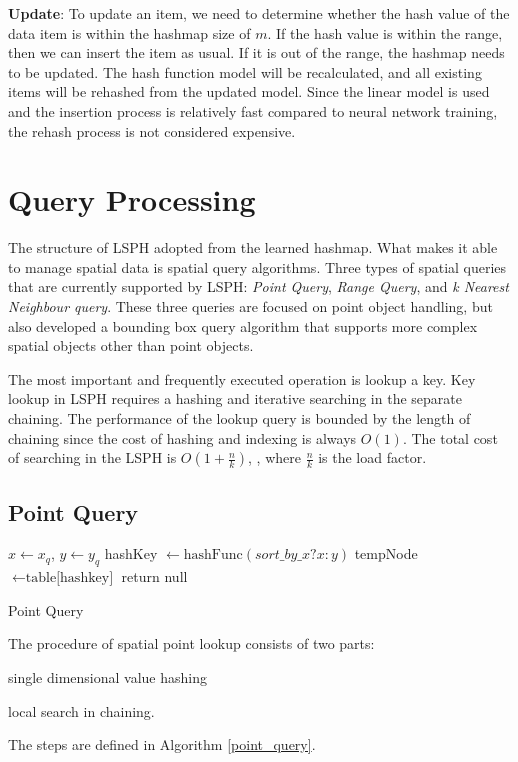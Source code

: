 \textbf{Update}: To update an item, we need to determine whether the hash value of the data item is within the hashmap size of $m$. If the hash value is within the range, then we can insert the item as usual. If it is out of the range, the hashmap needs to be updated. The hash function model will be recalculated, and all existing items will be rehashed from the updated model. Since the linear model is used and the insertion process is relatively fast compared to neural network training, the rehash process is not considered expensive. 

\section{Query Processing}
The structure of LSPH adopted from the learned hashmap. What makes it able to manage spatial data is spatial query algorithms. Three types of spatial queries that are currently supported by LSPH: \textit{Point Query}, \textit{Range Query}, and \textit{k Nearest Neighbour query}. These three queries are focused on point object handling, but also developed a bounding box query algorithm that supports more complex spatial objects other than point objects.  

The most important and frequently executed operation is lookup a key. Key lookup in LSPH requires a hashing and iterative searching in the separate chaining. The performance of the lookup query is bounded by the length of chaining since the cost of hashing and indexing is always $O(1)$. The total cost of searching in the LSPH is $O(1 + \frac{n}{k})$, , where $\frac{n}{k}$ is the load factor. 

\subsection{Point Query}
\begin{algorithm}[H] \label{point_query}
\SetAlgoLined
{}
 $x\leftarrow{x_q}$, $y\leftarrow{y_q}$\;
 hashKey $\leftarrow{\text{hashFunc}(sort\_by\_x ? x : y)}$\;
 tempNode $\leftarrow{\text{table[hashkey]}}$\;
 return null\;
 \caption{Point Query}
\end{algorithm}

The procedure of spatial point lookup consists of two parts: 
\begin{enumerate*}
    \item single dimensional value hashing
    \item local search in chaining.
\end{enumerate*}
 The steps are defined in Algorithm \ref{point_query}.

